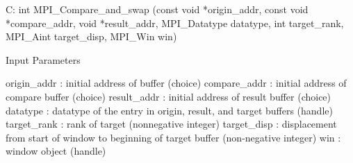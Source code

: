 C:
int MPI_Compare_and_swap
   (const void *origin_addr, const void *compare_addr,
    void *result_addr, MPI_Datatype datatype, 
    int target_rank, MPI_Aint target_disp, 
    MPI_Win win)

Input Parameters

origin_addr : initial address of buffer (choice)
compare_addr : initial address of compare buffer (choice)
result_addr : initial address of result buffer (choice)
datatype : datatype of the entry in origin, result, and target buffers (handle)
target_rank : rank of target (nonnegative integer)
target_disp : displacement from start of window to beginning
    of target buffer (non-negative integer)
win : window object (handle)
